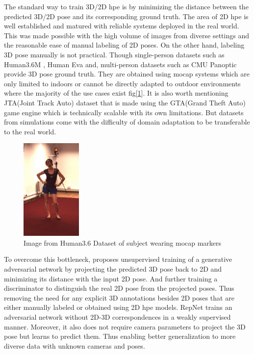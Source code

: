 The standard way to train 3D/2D \ac{hpe} is by minimizing the distance between the predicted 3D/2D pose and its corresponding ground truth. The area of 2D \ac{hpe} is well established and matured with reliable systems deployed in the real world. This was made possible with the high volume of images from diverse settings and the reasonable ease of manual labeling of 2D poses. On the other hand, labeling 3D pose manually is not practical. Though single-person datasets such as Human3.6M \cite{H3.6}, Human Eva \cite{HumanEva} and, multi-person datasets such as CMU Panoptic \cite{cmuPanoptic} provide 3D pose ground truth. They are obtained using \ac{mocap} systems which are only limited to indoors or cannot be directly adapted to outdoor environments where the majority of the use cases exist fig[\ref{fig:h36_mocap}]. It is also worth mentioning JTA(Joint Track Auto) dataset \cite{JTA} that is made using the GTA(Grand Theft Auto) game engine which is technically scalable with its own limitations. But datasets from simulations come with the difficulty of domain adaptation to be transferable to the real world.

\begin{figure}[!h]
    \centering
    \includegraphics[width=30mm]{figures/h36_mocap.png}
    \caption{Image from Human3.6 Dataset \cite{H3.6} of subject wearing \ac{mocap} markers}
    \label{fig:h36_mocap}
\end{figure}

To overcome this bottleneck, \cite{unsupervisedAdversarial} proposes unsupervised training of a generative adversarial network by projecting the predicted 3D pose back to 2D and minimizing its distance with the input 2D pose. And further training a discriminator to distinguish the real 2D pose from the projected poses. Thus removing the need for any explicit 3D annotations besides 2D poses that are either manually labeled or obtained using 2D \ac{hpe} models. RepNet \cite{repnet} trains an adversarial network without 2D-3D correspondences in a weakly supervised manner. Moreover, it also does not require camera parameters to project the 3D pose but learns to predict them. Thus enabling better generalization to more diverse data with unknown cameras and poses.

